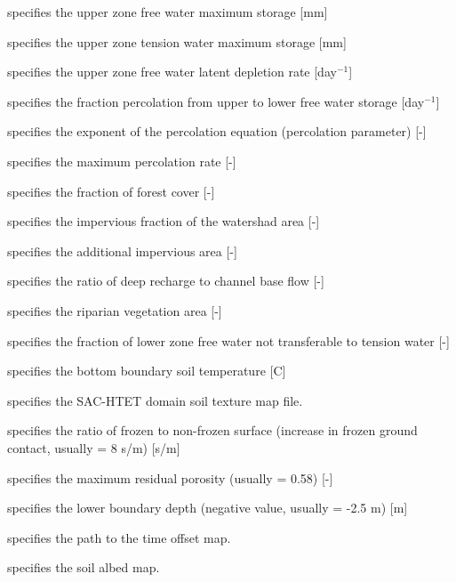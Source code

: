   specifies the
 upper zone free water maximum storage [mm]

  specifies the
 upper zone tension water maximum storage [mm]

  specifies the
 upper zone free water latent depletion rate [day$^{-1}$]

  specifies the
 fraction percolation from upper to lower free water storage [day$^{-1}$]

  specifies the
 exponent of the percolation equation (percolation parameter) [-]

  specifies the
 maximum percolation rate [-]

  specifies the
 fraction of forest cover [-]

  specifies the
 impervious fraction of the watershad area [-]

  specifies the
 additional impervious area [-]

  specifies the
 ratio of deep recharge to channel base flow [-]

  specifies the
 riparian vegetation area [-]

  specifies the
 fraction of lower zone free water not transferable to tension water [-]

  specifies the
 bottom boundary soil temperature [C]

  specifies the SAC-HTET domain soil texture map file.

  specifies the
 ratio of frozen to non-frozen surface (increase in frozen ground contact, usually = 8 s/m) [s/m]

  specifies the
 maximum residual porosity (usually = 0.58) [-]

  specifies the
 lower boundary depth (negative value, usually = -2.5 m) [m]

  specifies the path to the
  time offset map.

  specifies the soil albed map.

 

